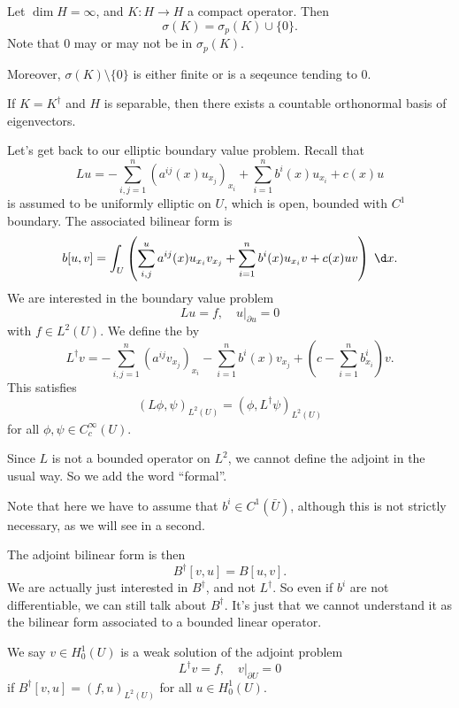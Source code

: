 \documentclass[a4paper]{article}
\begin{document}
\begin{thm}
  Let $\dim H = \infty$, and $K: H \to H$ a compact operator. Then
  \[
    \sigma(K) = \sigma_p(K) \cup \{0\}.
  \]
  Note that $0$ may or may not be in $\sigma_p(K)$.

  Moreover, $\sigma(K) \setminus \{0\}$ is either finite or is a seqeunce tending to $0$.

  If $K = K^\dagger$ and $H$ is separable, then there exists a countable orthonormal basis of eigenvectors.
\end{thm}

Let's get back to our elliptic boundary value problem. Recall that
\[
  Lu = - \sum_{i, j = 1}^n (a^{ij}(x) u_{x_j})_{x_i} + \sum_{i = 1}^n b^i(x) u_{x_i} + c(x) u
\]
is assumed to be uniformly elliptic on $U$, which is open, bounded with $C^1$ boundary. The associated bilinear form is
\[
  b[u, v] = \int_U \left(\sum_{i, j}^u a^{ij}(x) u_{x_i} v_{x_j} + \sum_{i = 1}^n b^i(x) u_{x_i} v + c(x) uv\right)\;\d x.
\]
We are interested in the boundary value problem
\[
  Lu = f,\quad u|_{\partial u} = 0
\]
with $f \in L^2(U)$. We define the  by
\[
  L^\dagger v = - \sum_{i, j = 1}^n (a^{ij} v_{x_j})_{x_i} - \sum_{i = 1}^n b^i(x) v_{x_j} + \left(c - \sum_{i = 1}^n b^i_{x_i}\right)v.
\]
This satisfies
\[
  (L\phi, \psi)_{L^2(U)} = (\phi, L^\dagger \psi)_{L^2(U)}
\]
for all $\phi, \psi \in C_c^\infty(U)$.

Since $L$ is not a bounded operator on $L^2$, we cannot define the adjoint in the usual way. So we add the word ``formal''.

Note that here we have to assume that $b^i \in C^1(\bar{U})$, although this is not strictly necessary, as we will see in a second.

The adjoint bilinear form is then
\[
  B^\dagger[v, u] = B[u, v].
\]
We are actually just interested in $B^\dagger$, and not $L^\dagger$. So even if $b^i$ are not differentiable, we can still talk about $B^\dagger$. It's just that we cannot understand it as the bilinear form associated to a bounded linear operator.

We say $v \in H_0^1(U)$ is a weak solution of the adjoint problem
\[
  L^\dagger v = f,\quad v|_{\partial U} = 0
\]
if $B^\dagger[v, u] = (f, u)_{L^2(U)}$ for all $u \in H_0^1(U)$.
\end{document}
